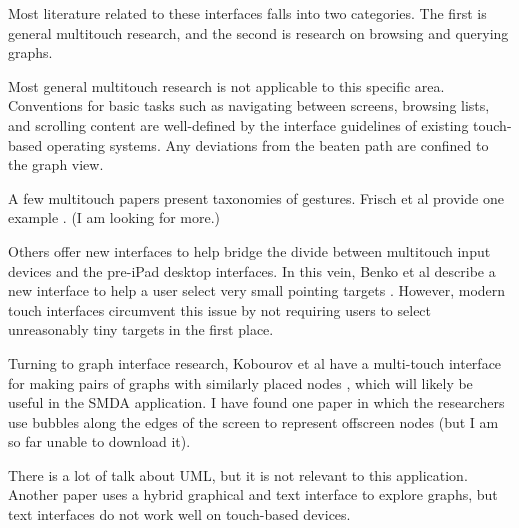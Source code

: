 Most literature related to these interfaces falls into two categories. The first
is general multitouch research, and the second is research on browsing and
querying graphs.

Most general multitouch research is not applicable to this specific area.
Conventions for basic tasks such as navigating between screens, browsing lists,
and scrolling content are well-defined by the interface guidelines of existing
touch-based operating systems. Any deviations from the beaten path are confined
to the graph view.

A few multitouch papers present taxonomies of gestures. Frisch et al provide one
example \cite{multitouch:gestures}. (I am looking for more.)

Others offer new interfaces to help bridge the divide between multitouch input
devices and the pre-iPad desktop interfaces. In this vein, Benko et al describe
a new interface to help a user select very small pointing targets
\cite{multitouch:tiny-select}. However, modern touch interfaces circumvent this
issue by not requiring users to select unreasonably tiny targets in the first
place.

Turning to graph interface research, Kobourov et al have a multi-touch interface
for making pairs of graphs with similarly placed nodes
\cite{graph-interaction:simultaneousgraphdrawing}, which will likely be
useful in the SMDA application. I have found one paper in which the
researchers use bubbles along the edges of the screen to represent offscreen
nodes (but I am so far unable to download it).

There is a lot of talk about UML, but it is not relevant to this application.
Another paper uses a hybrid graphical and text interface to explore graphs, but
text interfaces do not work well on touch-based devices.
